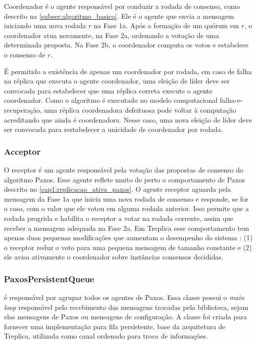 Coordenador é o agente responsável por conduzir a rodada de consenso, como descrito na
\autoref{subsec:algoritmo_basico}. Ele é o agente que envia a mensagem iniciando uma nova
rodada $r$ na Fase 1a. Após a formação de um quórum em $r$, o coordenador atua novamente,
na Fase 2a, ordenando a votação de uma determinada proposta. Na Fase 2b, o coordenador
computa os votos e estabelece o consenso de $r$.

É permitido a existência de apenas um coordenador por rodada, em caso de falha na réplica
que executa o agente coordenador, uma eleição de líder deve ser convocada para estabelecer
que uma réplica correta execute o agente coordenador. Como o algoritmo é executado no
modelo computacional falha-e-recuperação, uma réplica coordenadora defeituosa pode voltar
à computação acreditando que ainda é coordenadora. Nesse caso, uma nova eleição de líder
deve ser convocada para restabelecer a unicidade de coordenador por rodada.

\subsubsection{Acceptor}

O receptor é um agente responsável pela votação das propostas de consenso do algoritmo
Paxos. Esse agente reflete muito de perto o comportamento de Paxos descrito no
\autoref{cap1:replicacao_ativa_paxos}. O agente receptor aguarda pela mensagem da Fase 1a
que inicia uma nova rodada de consenso e responde, se for o caso, com o valor que ele
votou em alguma rodada anterior. Isso permite que a rodada progrida e habilita o
receptor a votar na rodada corrente, assim que receber a mensagem adequada na Fase 2a. Em
Treplica esse comportamento tem apenas duas pequenas modificações que aumentam o
desempenho do sistema \cite{vieira-tr10b}: (1) o receptor reduz o voto para uma pequena
mensagem de tamanho constante e (2) ele avisa ativamente o coordenador sobre instâncias
consensos decididas.

\subsubsection{PaxosPersistentQueue}

 é responsável por agrupar todos os agentes de Paxos.
Essa classe possui o \emph{main loop} responsável pelo recebimento das mensagens trocadas
pela biblioteca, sejam elas mensagens de Paxos ou mensagens de configuração. A classe
 foi criada para fornecer uma implementação para fila
persistente, base da arquitetura de Treplica, utilizada como canal ordenado para troca de
informações.


